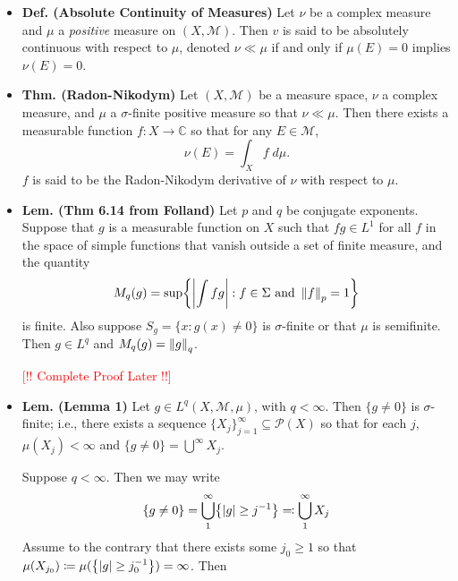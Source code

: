\documentclass{article}
\begin{document}
\begin{itemize}
	Then $\nu$ is a complex measure. 
	\item \textbf{Def. (Absolute Continuity of Measures)} Let $\nu$ be a complex measure and $\mu$ a \textit{positive} measure on $(X, \mathscr{M})$. Then $v$ is said to be absolutely continuous with respect to $\mu$, denoted $\nu \ll \mu$ if and only if $\mu(E) = 0$ implies $\nu(E) = 0$. 
	\item \textbf{Thm. (Radon-Nikodym)} Let $(X, \mathscr{M})$ be a measure space, $\nu$ a complex measure, and $\mu$ a $\sigma$-finite positive measure so that $\nu \ll \mu$. Then there exists a measurable function $f: X \to \mathbb{C}$ so that for any $E \in \mathscr{M}$, 
		\begin{equation}
			\nu(E) = \int_{X}f\;d\mu. 
		\end{equation} 
	$f$ is said to be the Radon-Nikodym derivative of $\nu$ with respect to $\mu$. 
	\item \textbf{Lem. (Thm 6.14 from Folland)} Let $p$ and $q$ be conjugate exponents. Suppose that $g$ is a measurable function on $X$ such that $fg \in L^{1}$ for all $f$ in the space of simple functions that vanish outside a set of finite measure, and the quantity 
		\begin{equation}
			M_{q}(g) = \sup\brac*{\abs{\int fg}: f \in \Sigma \text{ and } \norm{f}_{p} = 1}
		\end{equation}
	is finite. Also suppose $S_{g} = \{x: g(x) \neq 0\}$ is $\sigma$-finite or that $\mu$ is semifinite. Then $g \in L^{q}$ and $M_{q}(g) = \norm{g}_{q}$. \newline 
	\begin{solutions}
		\textcolor{red}{[!! Complete Proof Later !!]}
	\end{solutions}
	\item \textbf{Lem. (Lemma 1)} Let $g \in L^{q}(X, \mathscr{M}, \mu)$, with $q < \infty$. Then $\{g \neq 0\}$ is $\sigma$-finite; i.e., there exists a sequence $\{X_{j}\}_{j= 1}^{\infty} \subseteq \mathscr{P}(X)$ so that for each $j$, $\mu(X_{j}) < \infty$ and $\{g \neq 0\} = \bigcup^{\infty}X_{j}$. \newline 
	\begin{solutions}
		Suppose $q < \infty$. Then we may write 
		\begin{equation}
			\brac*{g \neq 0} = \bigcup_{1}^{\infty}\brac*{\abs{g} \geq j^{-1}} \eqqcolon \bigcup_{1}^{\infty}X_{j}
		\end{equation}
		Assume to the contrary that there exists some $j_{0} \geq 1$ so that $\mu(X_{j_{0}}) \coloneqq \mu(\brac*{\abs{g} \geq j_{0}^{-1}}) = \infty$. Then 

\end{solutions}
\end{itemize}
\end{document}
